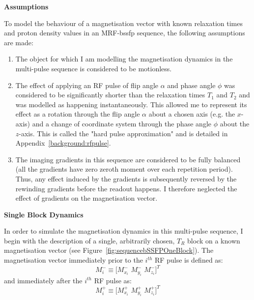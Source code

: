 \hfill

\large \textbf{Assumptions} \normalsize

To model the behaviour of a magnetisation vector with known relaxation times and proton density values in an MRF-\ac{bssfp} sequence, the following assumptions are made:

\begin{enumerate}
    \item The object for which I am modelling the magnetisation dynamics in the multi-pulse sequence is considered to be motionless.

    \item The effect of applying an RF pulse of flip angle $\alpha$ and phase angle $\phi$ was considered to be significantly shorter than the relaxation times $T_1$ and $T_2$ and was modelled as happening instantaneously.
    This allowed me to represent its effect as a rotation through the flip angle $\alpha$ about a chosen axis (e.g. the $x$-axis) and a change of coordinate system through the phase angle $\phi$ about the $z$-axis.
    This is called the "hard pulse approximation" and is detailed in Appendix~\ref{background:rfpulse}.
    
    \item The imaging gradients in this sequence are considered to be fully balanced (all the gradients have zero zeroth moment over each repetition period).
    Thus, any effect induced by the gradients is subsequently reversed by the rewinding gradients before the readout happens.
    I therefore neglected the effect of gradients on the magnetisation vector.

\end{enumerate}

\hfill

\large \textbf{Single Block Dynamics} \normalsize

In order to simulate the magnetisation dynamics in this multi-pulse sequence, 
I begin with the description of a single, arbitrarily chosen, $T_R$ block on a known magnetisation vector (see Figure~\ref{fig:sequencebSSFPOneBlock}).
The magnetisation vector immediately prior to the $i^{th}$ RF pulse is defined as:
\begin{equation}
    M^{-}_i \equiv \big[ M^-_{x_i} \, \,  M^-_{y_i} \, \, M^-_{z_i} \big]^T
\end{equation}
and immediately after the $i^{th}$ RF pulse as:
\begin{equation}
    M^{+}_i \equiv \big[ M^+_{x_i} \, \,  M^+_{y_i} \, \, M^+_{z_i} \big]^T
\end{equation}

